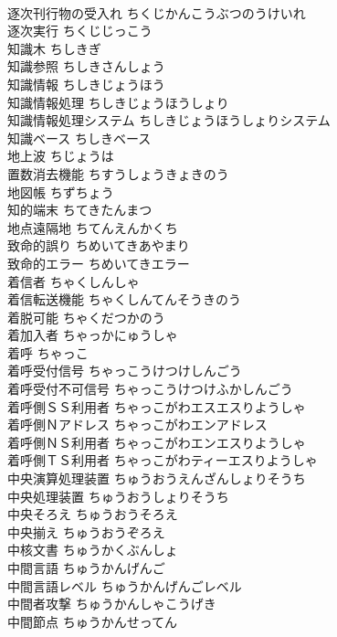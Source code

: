 \documentclass[8pt]{extreport}
\begin{document}
\begin{CJK}{UTF8}{min}
\\	逐次刊行物の受入れ	ちくじかんこうぶつのうけいれ	
\\	逐次実行	ちくじじっこう	
\\	知識木	ちしきぎ	
\\	知識参照	ちしきさんしょう	
\\	知識情報	ちしきじょうほう	
\\	知識情報処理	ちしきじょうほうしょり	
\\	知識情報処理システム	ちしきじょうほうしょりシステム	
\\	知識ベース	ちしきベース	
\\	地上波	ちじょうは	
\\	置数消去機能	ちすうしょうきょきのう	
\\	地図帳	ちずちょう	
\\	知的端末	ちてきたんまつ	
\\	地点遠隔地	ちてんえんかくち	
\\	致命的誤り	ちめいてきあやまり	
\\	致命的エラー	ちめいてきエラー	
\\	着信者	ちゃくしんしゃ	
\\	着信転送機能	ちゃくしんてんそうきのう	
\\	着脱可能	ちゃくだつかのう	
\\	着加入者	ちゃっかにゅうしゃ	
\\	着呼	ちゃっこ	
\\	着呼受付信号	ちゃっこうけつけしんごう	
\\	着呼受付不可信号	ちゃっこうけつけふかしんごう	
\\	着呼側ＳＳ利用者	ちゃっこがわエスエスりようしゃ	
\\	着呼側Ｎアドレス	ちゃっこがわエンアドレス	
\\	着呼側ＮＳ利用者	ちゃっこがわエンエスりようしゃ	
\\	着呼側ＴＳ利用者	ちゃっこがわティーエスりようしゃ	
\\	中央演算処理装置	ちゅうおうえんざんしょりそうち	
\\	中央処理装置	ちゅうおうしょりそうち	
\\	中央そろえ	ちゅうおうそろえ	
\\	中央揃え	ちゅうおうぞろえ	
\\	中核文書	ちゅうかくぶんしょ	
\\	中間言語	ちゅうかんげんご	
\\	中間言語レベル	ちゅうかんげんごレベル	
\\	中間者攻撃	ちゅうかんしゃこうげき	
\\	中間節点	ちゅうかんせってん	

\end{CJK}
\end{document}
